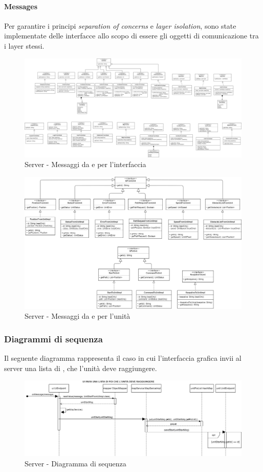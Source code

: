 \paragraph{Messages}
Per garantire i principi \textit{separation of concerns} e \textit{layer isolation}, sono state implementate delle interfacce allo scopo di essere gli oggetti di comunicazione tra i layer stessi.
\begin{figure}[H]
	\centering
	\includegraphics[width=18cm]{img/server_from_to_ui.png}
	\caption{Server - Messaggi da e per l'interfaccia}
\end{figure}
\begin{figure}[H]
	\centering
	\includegraphics[width=18cm]{img/server_from_to_unit.png}
	\caption{Server - Messaggi da e per l'unità}
\end{figure}

\subsubsection{Diagrammi di sequenza}
Il seguente diagramma rappresenta il caso in cui l'interfaccia grafica invii al server una lista di , che l'unità deve raggiungere.
\begin{figure}[H]
	\centering
	\includegraphics[width=13cm]{img/server_seq1.png}
	\caption{Server - Diagramma di sequenza}
\end{figure}

